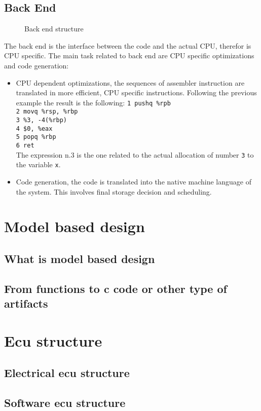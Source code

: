 \documentclass[../main.tex]{subfiles}
\begin{document}
\subsection{Back End}
\begin{figure}[h]
  \centering
{}
  \caption{Back end structure}
\end{figure}
The back end is the interface between the code and the actual CPU, therefor is CPU specific. The main task related to back end are CPU specific optimizations and code generation:
\begin{itemize}
    \item CPU dependent optimizations, the sequences of assembler instruction are translated in more efficient, CPU specific instructions. Following the previous example the result is the following:
        \texttt{1 pushq \%rpb}\\
        \texttt{2 movq \%rsp, \%rbp}\\
        \texttt{3 \%3, -4(\%rbp)}\\
        \texttt{4 \$0, \%eax}\\
        \texttt{5 popq \%rbp}\\
        \texttt{6 ret}\\
    The expression n.3 is the one related to the actual allocation of number \texttt{3} to the variable \texttt{x}.
    \item Code generation, the code is translated into the native machine language of the system. This involves final storage decision and scheduling. 
\end{itemize}
\section{Model based design}
\subsection{What is model based design}
\subsection{From functions to c code or other type of artifacts}
\section{Ecu structure}
\subsection{Electrical ecu structure}
\subsection{Software ecu structure}
\cleardoublepage
\end{document}
